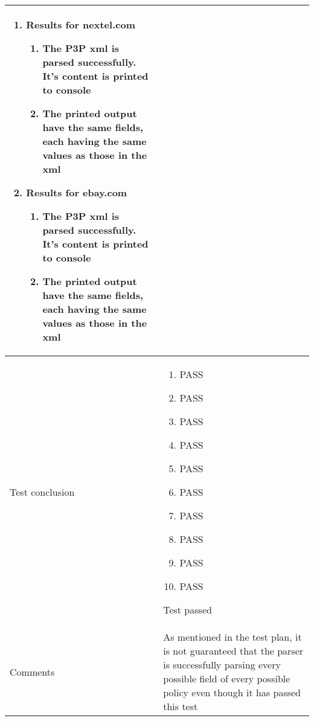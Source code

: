 \documentclass[10pt]{article}
\begin{document}
\begin{center}
\begin{longtable}{ | p{4cm} | p{10cm} | }
\begin{enumerate}
							\item Results for nextel.com
							\begin{enumerate}
								\item The P3P xml is parsed successfully. It's content is printed to console
								\item The printed output have the same fields, each having the same values as those in the xml
							\end{enumerate}
					
							\item Results for ebay.com
							\begin{enumerate}
								\item The P3P xml is parsed successfully. It's content is printed to console
								\item The printed output have the same fields, each having the same values as those in the xml
							\end{enumerate}
						\end{enumerate}
							 \\  [3pt] \hline

			Test conclusion & 	\begin{enumerate}
							\item PASS
							\item PASS
							\item PASS
							\item PASS
							\item PASS
							\item PASS
							\item PASS
							\item PASS
							\item PASS
							\item PASS
						\end{enumerate}
						Test passed \\  [3pt] \hline
			Comments & As mentioned in the test plan, it is not guaranteed that the parser is successfully parsing every possible field of every possible policy even though it has passed this test
					\\ [3pt] \hline
		\end{longtable}
	\end{center}
\end{document}
